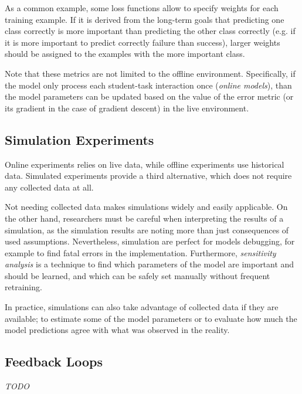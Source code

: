 As a common example, some loss functions allow to specify weights for each training example.
If it is derived from the long-term goals that predicting one class correctly
  is more important than predicting the other class correctly
  (e.g. if it is more important to predict correctly failure than success),
  larger weights should be assigned to the examples with the more important class.

Note that these metrics are not limited to the offline environment. Specifically, if the
model only process each student-task interaction once (\emph{online models}), than the
model parameters can be updated based on the value of the error metric
(or its gradient in the case of gradient descent) in the live environment.

\subsection{Simulation Experiments}

Online experiments relies on live data,
while offline experiments use historical data.
Simulated experiments provide a third alternative,
  which does not require any collected data at all.

Not needing collected data makes simulations widely and easily applicable.
On the other hand, researchers must be careful when interpreting
  the results of a simulation, as the simulation results are noting more than
  just consequences of used assumptions.
Nevertheless, simulation are perfect for models debugging,
  for example to find fatal errors in the implementation.
Furthermore, \emph{sensitivity analysis} is a technique to find
  which parameters of the model are important and should be learned,
  and which can be safely set manually without frequent retraining.

In practice, simulations can also take advantage of collected data
  if they are available; to estimate some of the model parameters
  or to evaluate how much the model predictions agree with
  what was observed in the reality.



\subsection{Feedback Loops}

\emph{TODO}



